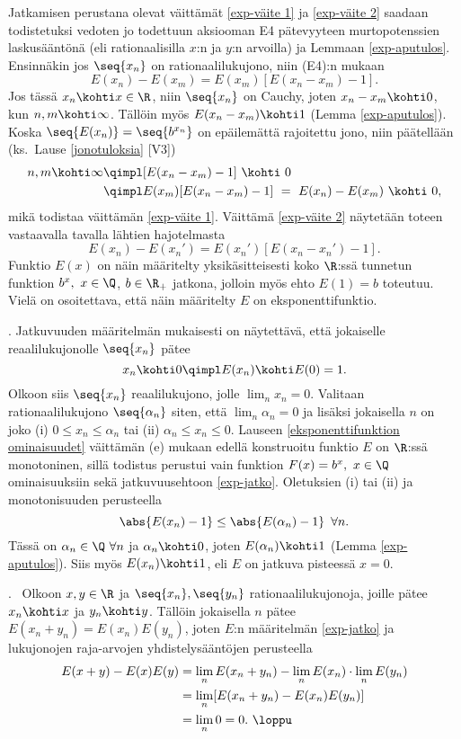 Jatkamisen perustana olevat väittämät \eqref{exp-väite 1} ja \eqref{exp-väite 2}
saadaan todistetuksi vedoten jo todettuun aksiooman E4 pätevyyteen murtopotenssien
laskusääntönä (eli rationaalisilla $x$:n ja $y$:n arvoilla) ja Lemmaan \ref{exp-aputulos}.
Ensinnäkin jos $\seq{x_n}$ on rationaalilukujono, niin (E4):n mukaan
\[
E(x_n)-E(x_m) = E(x_m)[E(x_n-x_m)-1].
\]
Jos tässä $x_n \kohti x\in\R$, niin $\seq{x_n}$ on Cauchy, joten $x_n-x_m \kohti 0$, kun 
$n,m \kohti \infty$. Tällöin myös $E(x_n-x_m) \kohti 1$ (Lemma \ref{exp-aputulos}). Koska
$\seq{E(x_n)}=\seq{b^{x_n}}$ on epäilemättä rajoitettu jono, niin päätellään
(ks.\ Lause \ref{jonotuloksia} [V3])
\begin{align*}
n,m \kohti \infty &\qimpl [E(x_n-x_m)-1]\ \kohti\ 0 \\
                  &\qimpl E(x_m)[E(x_n-x_m)-1]\ =\ E(x_n)-E(x_m)\ \kohti\ 0,
\end{align*}
mikä todistaa väittämän \eqref{exp-väite 1}. Väittämä \eqref{exp-väite 2} näytetään toteen 
vastaavalla tavalla lähtien hajotelmasta
\[
E(x_n)-E(x_n') = E(x_n')[E(x_n-x_n')-1].
\]   
Funktio $E(x)$ on näin määritelty yksikäsitteisesti koko $\R$:ssä tunnetun funktion 
$b^x,\ x\in\Q$, $b\in\R_+$ jatkona, jolloin myös ehto $E(1)=b$ toteutuu. Vielä on osoitettava,
että näin määritelty $E$ on eksponenttifunktio.

. Jatkuvuuden määritelmän mukaisesti on näytettävä, että jokaiselle
reaalilukujonolle $\seq{x_n}$ pätee
\[
x_n \kohti 0 \qimpl E(x_n) \kohti E(0)=1.
\]
Olkoon siis $\seq{x_n}$ reaalilukujono, jolle $\lim_n x_n=0$. Valitaan rationaalilukujono
$\seq{\alpha_n}$ siten, että $\lim_n\alpha_n=0$ ja lisäksi jokaisella $n$ on joko (i)
$0 \le x_n \le \alpha_n$ tai (ii) $\alpha_n \le x_n \le 0$. Lauseen 
\ref{eksponenttifunktion ominaisuudet} väittämän (e) mukaan edellä konstruoitu funktio $E$ on
$\R$:ssä monotoninen, sillä todistus perustui vain funktion $F(x)=b^x,\ x\in\Q\,$
ominaisuuksiin sekä jatkuvuusehtoon \eqref{exp-jatko}. Oletuksien (i) tai (ii) ja
monotonisuuden perusteella
\[
\abs{E(x_n)-1} \le \abs{E(\alpha_n)-1}\,\ \forall n.
\]
Tässä on $\alpha_n\in\Q\ \forall n$ ja $\alpha_n \kohti 0$, joten $E(\alpha_n) \kohti 1$
(Lemma \ref{exp-aputulos}). Siis myös $E(x_n) \kohti 1$, eli $E$ on jatkuva pisteessä $x=0$.

. \ Olkoon $x,y\in\R$ ja $\seq{x_n},\seq{y_n}$ rationaalilukujonoja,
joille pätee $x_n \kohti x$ ja $y_n \kohti y$. Tällöin jokaisella $n$ pätee
$E(x_n+y_n)=E(x_n)E(y_n)$, joten $E$:n määritelmän \eqref{exp-jatko} ja lukujonojen
raja-arvojen yhdistelysääntöjen perusteella
\begin{align*}
E(x+y)-E(x)E(y) &= \lim_n E(x_n+y_n) - \lim_n E(x_n) \cdot \lim_n E(y_n) \\
                &= \lim_n [E(x_n+y_n)-E(x_n)E(y_n)] \\
                &= \lim_n 0 = 0. \ \loppu
\end{align*}

